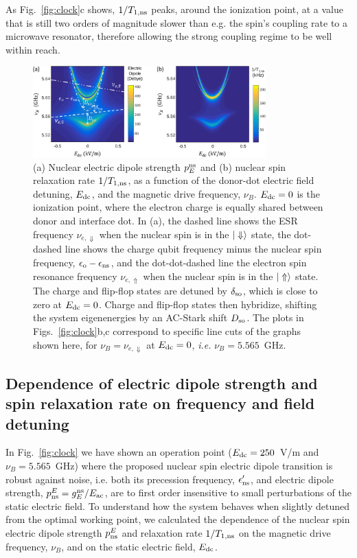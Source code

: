 As Fig.~\ref{fig:clock}c shows, ${1}/{T_{1,\rm ns}}$ peaks, around the ionization point, at a value that is still two orders of magnitude slower than e.g. the spin's coupling rate to a microwave resonator, therefore allowing the strong coupling regime to be well within reach.



\begin{figure}
	\centering
	\includegraphics[width=0.8\textwidth]{fig4_v2}
	\caption{
		(a) Nuclear electric dipole strength $p_E^{\rm ns}$ and
		(b) nuclear spin relaxation rate $1/T_{\rm 1,ns}$, as a function of the donor-dot electric field detuning, $E_{\rm dc}$, and the magnetic drive frequency, $\nu_B$. $E_{\rm dc}=0$ is the ionization point, where the electron charge is equally shared between donor and interface dot. In (a), the dashed line shows the ESR frequency $\nu_{e,\Downarrow}$ when the nuclear spin is in the  $|\Downarrow\rangle$ state, the dot-dashed line shows the charge qubit frequency minus the nuclear spin frequency, $\epsilon_{\rm o} - \epsilon_{\rm ns}$, and the dot-dot-dashed line the electron spin resonance frequency $\nu_{e,\Uparrow}$ when the nuclear spin is in the $|\Uparrow\rangle$ state. The charge and flip-flop states are detuned by $\delta_{\rm so}$, which is close to zero at $E_{\rm dc}=0$. Charge and flip-flop states then hybridize, shifting the system eigenenergies by an AC-Stark shift $D_{\rm so}$. The plots in Figs.~\ref{fig:clock}b,c correspond to specific line cuts of the graphs shown here, for $\nu_B=\nu_{e,\Downarrow}$ at $E_{\rm dc}=0$, \textit{i.e.} $\nu_B=5.565$~GHz.
	}
	\label{fig:fig4}
\end{figure}


\subsection{Dependence of electric dipole strength and spin relaxation rate on frequency and field detuning} \label{supp:detdep}

In Fig.~\ref{fig:clock} we have shown an operation point ($E_{\rm dc}=250$~V/m and $\nu_B=5.565$~GHz) where the proposed nuclear spin electric dipole transition is robust against noise, i.e. both its precession frequency, $\epsilon_{\rm ns}'$, and electric dipole strength, $p^E_{\rm ns}=g_E^{\rm ns}/E_{\rm ac}$, are to first order insensitive to small perturbations of the static electric field. To understand how the system behaves when slightly detuned from the optimal working point, we calculated the dependence of the nuclear spin electric dipole strength $p^E_{\rm ns}$ and relaxation rate $1/T_{1, \rm ns}$ on the magnetic drive frequency, $\nu_B$, and on the static electric field, $E_{\rm dc}$. 

